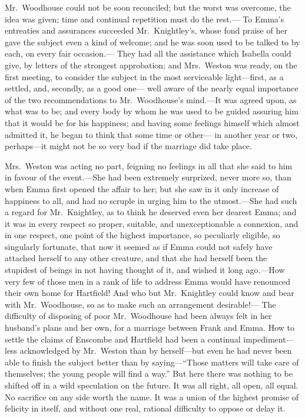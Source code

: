 Mr.\ Woodhouse could not be soon reconciled; but the worst was overcome,
the idea was given; time and continual repetition must do the rest.---%
To Emma's entreaties and assurances succeeded Mr.\ Knightley's,
whose fond praise of her gave the subject even a kind of welcome;
and he was soon used to be talked to by each, on every fair occasion.---%
They had all the assistance which Isabella could give, by letters
of the strongest approbation; and Mrs.\ Weston was ready,
on the first meeting, to consider the subject in the most
serviceable light---first, as a settled, and, secondly, as a good one---%
well aware of the nearly equal importance of the two recommendations
to Mr.\ Woodhouse's mind.---It was agreed upon, as what was to be;
and every body by whom he was used to be guided assuring him that
it would be for his happiness; and having some feelings himself
which almost admitted it, he began to think that some time or other---%
in another year or two, perhaps---it might not be so very bad
if the marriage did take place.

Mrs.\ Weston was acting no part, feigning no feelings in all that she
said to him in favour of the event.---She had been extremely surprized,
never more so, than when Emma first opened the affair to her;
but she saw in it only increase of happiness to all, and had
no scruple in urging him to the utmost.---She had such a regard
for Mr.\ Knightley, as to think he deserved even her dearest Emma;
and it was in every respect so proper, suitable, and unexceptionable
a connexion, and in one respect, one point of the highest importance,
so peculiarly eligible, so singularly fortunate, that now it seemed
as if Emma could not safely have attached herself to any other creature,
and that she had herself been the stupidest of beings in not having
thought of it, and wished it long ago.---How very few of those men
in a rank of life to address Emma would have renounced their own
home for Hartfield!  And who but Mr.\ Knightley could know and bear
with Mr.\ Woodhouse, so as to make such an arrangement desirable!---%
The difficulty of disposing of poor Mr.\ Woodhouse had been always
felt in her husband's plans and her own, for a marriage between Frank
and Emma.  How to settle the claims of Enscombe and Hartfield had
been a continual impediment---less acknowledged by Mr.\ Weston than
by herself---but even he had never been able to finish the subject
better than by saying---``Those matters will take care of themselves;
the young people will find a way.''  But here there was nothing to be
shifted off in a wild speculation on the future.  It was all right,
all open, all equal.  No sacrifice on any side worth the name.
It was a union of the highest promise of felicity in itself,
and without one real, rational difficulty to oppose or delay it.

